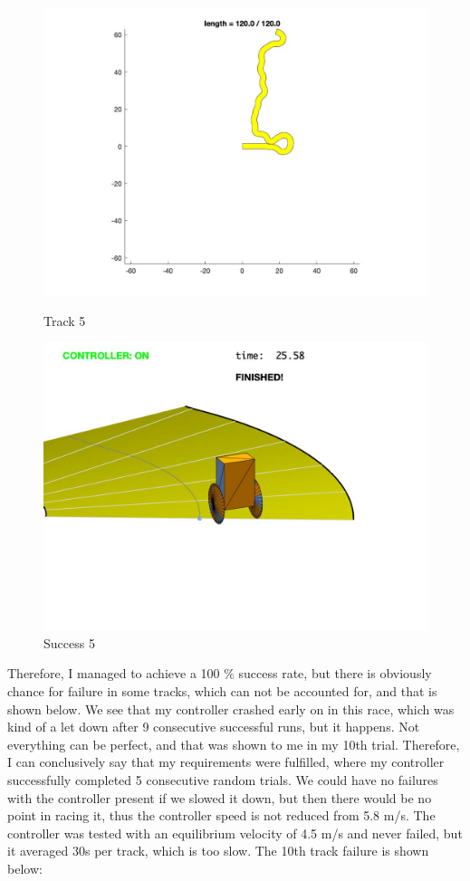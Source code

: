 \documentclass{article}
\begin{document}
\begin{figure}[H]
\centering
\begin{minipage}{.5\textwidth}
	\centering
	\includegraphics[width=.8\linewidth]{track 5.jpg}
	\caption{Track 5}
	\end{minipage}%
\begin{minipage}{.5\textwidth}
	\centering
	\includegraphics[width=.8\linewidth]{track 5 r.jpg}
	\caption{Success 5}
\end{minipage}
\end{figure}
Therefore, I managed to achieve a 100 $\%$ success rate, but there is obviously chance for failure in some tracks, which can not be accounted for, and that is shown below. We see that my controller crashed early on in this race, which was kind of a let down after 9 consecutive successful runs, but it happens. Not everything can be perfect, and that was shown to me in my 10th trial. Therefore, I can conclusively say that my requirements were fulfilled, where my controller successfully completed 5 consecutive random trials. We could have no failures with the controller present if we slowed it down, but then there would be no point in racing it, thus the controller speed is not reduced from 5.8 m/s. The controller was tested with an equilibrium velocity of 4.5 m/s and never failed, but it averaged 30s per track, which is too slow. The 10th track failure is shown below:
\end{document}
